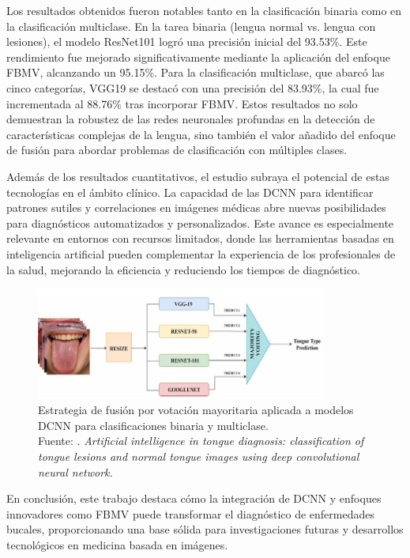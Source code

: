 Los resultados obtenidos fueron notables tanto en la clasificación binaria como en la clasificación multiclase. En la tarea binaria (lengua normal vs. lengua con lesiones), el modelo ResNet101 logró una precisión inicial del 93.53\%. Este rendimiento fue mejorado significativamente mediante la aplicación del enfoque FBMV, alcanzando un 95.15\%. Para la clasificación multiclase, que abarcó las cinco categorías, VGG19 se destacó con una precisión del 83.93\%, la cual fue incrementada al 88.76\% tras incorporar FBMV. Estos resultados no solo demuestran la robustez de las redes neuronales profundas en la detección de características complejas de la lengua, sino también el valor añadido del enfoque de fusión para abordar problemas de clasificación con múltiples clases.

Además de los resultados cuantitativos, el estudio subraya el potencial de estas tecnologías en el ámbito clínico. La capacidad de las DCNN para identificar patrones sutiles y correlaciones en imágenes médicas abre nuevas posibilidades para diagnósticos automatizados y personalizados. Este avance es especialmente relevante en entornos con recursos limitados, donde las herramientas basadas en inteligencia artificial pueden complementar la experiencia de los profesionales de la salud, mejorando la eficiencia y reduciendo los tiempos de diagnóstico.

\begin{figure}[H]
	\begin{center}
		\includegraphics[width=0.85\textwidth]{2/figures/8.jpeg}
		\caption[Clasificación de lesiones linguales con DCNN y FBMV]{Estrategia de fusión por votación mayoritaria aplicada a modelos DCNN para clasificaciones binaria y multiclase. \\
		Fuente: \cite{Tiryaki2024}. \textit{Artificial intelligence in tongue diagnosis: classification of tongue lesions and normal tongue images using deep convolutional neural network.}}
		\label{2:fig130}
	\end{center}
\end{figure}

En conclusión, este trabajo destaca cómo la integración de DCNN y enfoques innovadores como FBMV puede transformar el diagnóstico de enfermedades bucales, proporcionando una base sólida para investigaciones futuras y desarrollos tecnológicos en medicina basada en imágenes.
